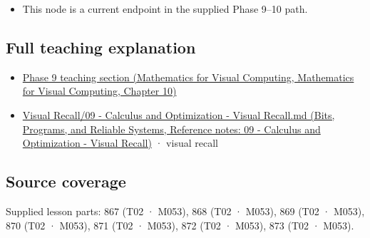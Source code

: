 \begin{itemize}
\tightlist
\item
  This node is a current endpoint in the supplied Phase 9--10 path.
\end{itemize}

\subsection{Full teaching explanation}\label{appendix-54c8f5828387-full-teaching-explanation}

\begin{itemize}
\tightlist
\item
  \href{../02-Mathematics-for-Visual-Computing/main.pdf\#nameddest=02-foundations-ii-ch026-optimization-and-inverse-problems}{Phase 9 teaching section (Mathematics for Visual Computing, Mathematics for Visual Computing, Chapter 10)}
\item
  \href{../01-Bits-Programs-and-Reliable-Systems/main.pdf\#nameddest=appendix-adf48f5dc5c1}{Visual Recall/09 - Calculus and Optimization - Visual Recall.md (Bits, Programs, and Reliable Systems, Reference notes: 09 - Calculus and Optimization - Visual Recall)} · visual recall
\end{itemize}

\subsection{Source coverage}\label{appendix-54c8f5828387-source-coverage}

Supplied lesson parts: 867 (T02 · M053), 868 (T02 · M053), 869 (T02 · M053), 870 (T02 · M053), 871 (T02 · M053), 872 (T02 · M053), 873 (T02 · M053).

